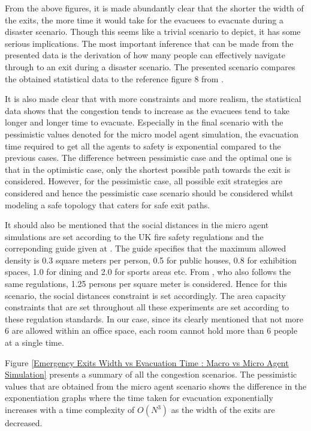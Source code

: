 From the above figures, it is made abundantly clear that the shorter the width of the exits, the more time it would take for the evacuees to evacuate during a disaster scenario. Though this seems like a trivial scenario to depict, it has some serious implications. The most important inference that can be made from the presented data is the derivation of how many people can effectively navigate through to an exit during a disaster scenario. The presented scenario compares the obtained statistical data to the reference figure 8 from \cite{ref5}.

It is also made clear that with more constraints and more realism, the statistical data shows that the congestion tends to increase as the evacuees tend to take longer and longer time to evacuate. Especially in the final scenario with the pessimistic values denoted for the micro model agent simulation, the evacuation time required to get all the agents to safety is exponential compared to the previous cases. The difference between pessimistic case and the optimal one is that in the optimistic case, only the shortest possible path towards the exit is considered. However, for the pessimistic case, all possible exit strategies are considered and hence the pessimistic case scenario should be considered whilst modeling a safe topology that caters for safe exit paths.

It should also be mentioned that the social distances in the micro agent simulations are set according to the UK fire safety regulations \cite{ref27} and the correponding guide given at \cite{ref28}. The guide specifies that the maximum allowed density is 0.3 square meters per person, 0.5 for public houses, 0.8 for exhibition spaces, 1.0 for dining and 2.0 for sports areas etc. From \cite{ref5}, who also follows the same regulations, 1.25 persons per square meter is considered. Hence for this scenario, the social distances constraint is set accordingly. The area capacity constraints that are set throughout all these experiments are set according to these regulation standards. In our case, since its clearly mentioned that not more 6 are allowed within an office space, each room cannot hold more than 6 people at a single time.

Figure \ref{Emergency Exits Width vs Evacuation Time : Macro vs Micro Agent Simulation} presents a summary of all the congestion scenarios. The pessimistic values that are obtained from the micro agent scenario shows the difference in the exponentiation graphs where the time taken for evacuation exponentially increases with a time complexity of $O(N^3)$ as the width of the exits are decreased.  

